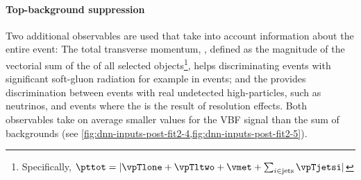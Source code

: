 \paragraph{Top-background suppression}
Two additional observables are used that take into account information about the entire event:
The total transverse momentum, \pttot, defined as the magnitude of the vectorial sum of the \pT of all selected objects\footnote{Specifically, $\pttot = | \vpTlone + \vpTltwo + \vmet + \sum_{i \in \text{jets}} \vpTjetsi |$}, helps discriminating events with significant soft-gluon radiation for example in \ttbar events; and the \METSig provides discrimination between events with real undetected high-\pT particles, such as neutrinos, and events where the \MET is the result of resolution effects. Both observables take on average smaller values for the VBF signal than the sum of backgrounds (see \cref{fig:dnn-inputs-post-fit2-4,fig:dnn-inputs-post-fit2-5}). 

